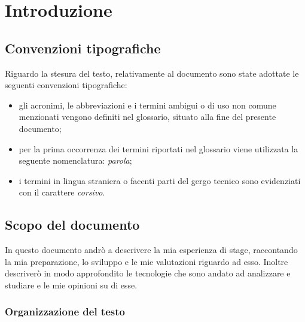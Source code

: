 
\chapter{Introduzione}
\label{cap:introduzione}
\section{Convenzioni tipografiche}

Riguardo la stesura del testo, relativamente al documento sono state adottate le seguenti convenzioni tipografiche:
\begin{itemize}
	\item gli acronimi, le abbreviazioni e i termini ambigui o di uso non comune menzionati vengono definiti nel glossario, situato alla fine del presente documento;
	\item per la prima occorrenza dei termini riportati nel glossario viene utilizzata la seguente nomenclatura: \emph{parola}\glsfirstoccur;
	\item i termini in lingua straniera o facenti parti del gergo tecnico sono evidenziati con il carattere \emph{corsivo}.
\end{itemize}

\section{Scopo del documento}
In questo documento andrò a descrivere la mia esperienza di stage, raccontando la mia preparazione, lo sviluppo e le mie valutazioni
riguardo ad esso. Inoltre descriverò in modo approfondito le tecnologie che sono andato ad analizzare e studiare e le mie opinioni su di esse.


\subsection{Organizzazione del testo}

